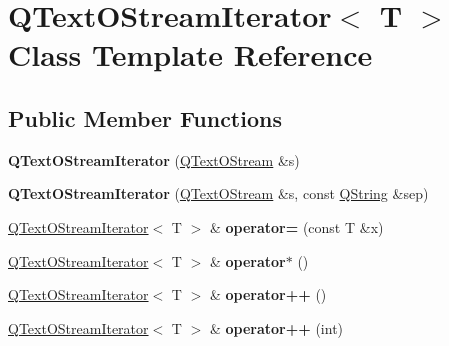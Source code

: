 \hypertarget{class_q_text_o_stream_iterator}{}\section{Q\+Text\+O\+Stream\+Iterator$<$ T $>$ Class Template Reference}
\label{class_q_text_o_stream_iterator}
\subsection*{Public Member Functions}
\begin{DoxyCompactItemize}
\item 
\mbox{\label{class_q_text_o_stream_iterator_a6cb912b389b1bdf8802e03d2ae5eedf9}} 
{\bfseries Q\+Text\+O\+Stream\+Iterator} (\mbox{\hyperlink{class_q_text_o_stream}{Q\+Text\+O\+Stream}} \&s)
\item 
\mbox{\label{class_q_text_o_stream_iterator_a4554edb576ba1e6cb27b4005448be264}} 
{\bfseries Q\+Text\+O\+Stream\+Iterator} (\mbox{\hyperlink{class_q_text_o_stream}{Q\+Text\+O\+Stream}} \&s, const \mbox{\hyperlink{class_q_string}{Q\+String}} \&sep)
\item 
\mbox{\label{class_q_text_o_stream_iterator_a925f0536b7f32c968c421c7a93c4c7e2}} 
\mbox{\hyperlink{class_q_text_o_stream_iterator}{Q\+Text\+O\+Stream\+Iterator}}$<$ T $>$ \& {\bfseries operator=} (const T \&x)
\item 
\mbox{\label{class_q_text_o_stream_iterator_ac74eaaa9e294245315af82f4344454a8}} 
\mbox{\hyperlink{class_q_text_o_stream_iterator}{Q\+Text\+O\+Stream\+Iterator}}$<$ T $>$ \& {\bfseries operator$\ast$} ()
\item 
\mbox{\label{class_q_text_o_stream_iterator_a815c5f104c33d19c380f3df259ed3a0c}} 
\mbox{\hyperlink{class_q_text_o_stream_iterator}{Q\+Text\+O\+Stream\+Iterator}}$<$ T $>$ \& {\bfseries operator++} ()
\item 
\mbox{\label{class_q_text_o_stream_iterator_ab345224394f90f10399041f45723b832}} 
\mbox{\hyperlink{class_q_text_o_stream_iterator}{Q\+Text\+O\+Stream\+Iterator}}$<$ T $>$ \& {\bfseries operator++} (int)
\end{DoxyCompactItemize}
